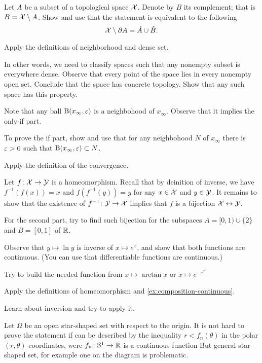 \begin{multicols}{2}
Let $A$ be a subset of a topological space $\mathcal{X}$.
Denote by $B$ its complement; that is $B\z=\c{X}\setminus A$.
Show and use that the statement is equivalent to the following 
\[\mathcal{X}\setminus\partial A =\mathring A\cup \mathring B.\]

Apply the definitions of neighborhood and dense set.

In other words, we need to classify spaces such that any nonempty subset is everywhere dense.
Observe that every point of the space lies in every nonempty open set.
Conclude that the space has concrete topology.
Show that any such space has this property.

Note that any ball $\mathrm{B}(x_\infty,\varepsilon)$ is a neighbohood of $x_\infty$.
Observe that it implies the only-if part.

To prove the if part, show and use that for any neighbohood $N$ of $x_\infty$ there is $\varepsilon>0$ such that $\mathrm{B}(x_\infty,\varepsilon)\subset N$.

Apply the definition of the convergence.

Let $f\colon\mathcal{X}\to\mathcal{Y}$ is a homeomorphism.
Recall that by deinition of inverse, we have $f^{-1}(f(x))=x$ and $f(f^{-1}(y))=y$ for any $x\in \mathcal{X}$ and $y\in\mathcal{Y}$.
It remains to show that the existence of $f^{-1}\colon\mathcal{Y}\to\mathcal{X}$ implies that $f$ is a bijection $\mathcal{X}\leftrightarrow\mathcal{Y}$.

For the second part,
try to find such bijection for the subspaces $A=[0,1)\cup \{2\}$ and $B=[0,1]$ of $\mathbb{R}$.

Observe that $y\mapsto \ln y$ is inverse of $x\mapsto e^x$,
and show that both functions are continuous.
(You can use that differentiable functions are continuous.)

Try to build the needed function from $x\mapsto \arctan x$ or $x\mapsto e^{-e^x}$

Apply the definitions of homeomorphism and \ref{ex:composition-continuous}.

Learn about inversion and try to apply it.

Let $\Omega$ be an open star-shaped set with respect to the origin.
It is not hard to prove the statement if can be described by the inequality $r<f_n(\theta)$ in the polar $(r,\theta)$-coordinates, were $f_n\colon\mathbb{S}^1\to \mathbb{R}$ is a continuous function
But general star-shaped set, for example one on the diagram is problematic.


\end{multicols}
